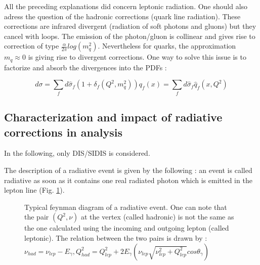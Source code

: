 All the preceding explanations did concern leptonic radiation. One should also adress the question of the hadronic corrections (quark line radiation). These corrections are infrared divergent (radiation of soft photons and gluons) but they cancel with loops. The emission of the photon/gluon is collinear and gives rise to correction of type $\frac{\alpha}{2\pi}log(m_{q}^{2})$. Nevertheless for quarks, the approximation $m_{q} \approx 0$ is giving rise to divergent corrections. One way to solve this issue is to factorize and absorb the divergences into the PDFs :

\[d\sigma = \sum_{f}d\hat{\sigma}_{f}(1+\delta_{f}(Q^{2},m^{2}_{q}))q_{f}(x) = \sum_{f}d\hat{\sigma}_{f}\hat{q}_{f}(x,Q^{2})\]

\subsection{Characterization and impact of radiative corrections in analysis}

In the following, only DIS/SIDIS is considered.

The description of a radiative event is given by the following : an event is called radiative as soon as it contains one real radiated photon which is emitted in the lepton line (Fig. \ref{fig:rad_evt}).

\begin{figure}[htb]
\centering
{}
\caption{Typical feynman diagram of a radiative event. One can note that the pair $(Q^2,\nu)$ at the vertex (called hadronic) is not the same as the one calculated using the incoming and outgoing lepton (called leptonic). The relation between the two pairs is drawn by : $\nu_{had} = \nu_{lep} - E_\gamma, Q^2_{had}=Q^2_{lep}+2E_\gamma(\nu_{lep} \sqrt{\nu_{lep}^2+Q^2_{lep}}cos\theta_\gamma)$}
\label{fig:rad_evt}
\end{figure}


